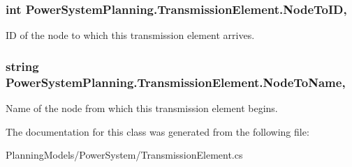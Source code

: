 \subsubsection[{\texorpdfstring{Node\+To\+ID}{NodeToID}}]{\setlength{\rightskip}{0pt plus 5cm}int Power\+System\+Planning.\+Transmission\+Element.\+Node\+To\+ID\hspace{0.3cm}{\ttfamily [get]}, {\ttfamily [set]}}\hypertarget{class_power_system_planning_1_1_transmission_element_a670796e35f8f4af35326cfc1dd1b104f}{}\label{class_power_system_planning_1_1_transmission_element_a670796e35f8f4af35326cfc1dd1b104f}


ID of the node to which this transmission element arrives. 

\subsubsection[{\texorpdfstring{Node\+To\+Name}{NodeToName}}]{\setlength{\rightskip}{0pt plus 5cm}string Power\+System\+Planning.\+Transmission\+Element.\+Node\+To\+Name\hspace{0.3cm}{\ttfamily [get]}, {\ttfamily [set]}}\hypertarget{class_power_system_planning_1_1_transmission_element_ad6028ae3c8e7ac1527cfde854c81dedd}{}\label{class_power_system_planning_1_1_transmission_element_ad6028ae3c8e7ac1527cfde854c81dedd}


Name of the node from which this transmission element begins. 



The documentation for this class was generated from the following file\+:\begin{DoxyCompactItemize}
\item 
Planning\+Models/\+Power\+System/Transmission\+Element.\+cs\end{DoxyCompactItemize}
